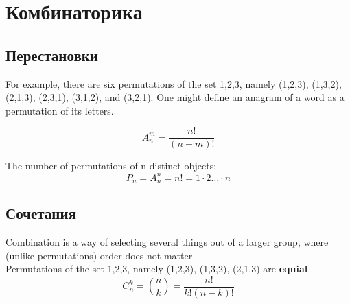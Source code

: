 \section{Комбинаторика}

\subsection{Перестановки}

For example, there are six permutations of the set {1,2,3}, namely (1,2,3), (1,3,2), (2,1,3), (2,3,1), (3,1,2), and (3,2,1). One might define an anagram of a word as a permutation of its letters. 

$$
A_n^m=\frac{n!}{(n-m)!} 
$$

The number of permutations of n distinct objects: \\

$$
P_n=A_n^n=n!=1\cdot2  \dots \cdot n
$$

\subsection{Сочетания}

Combination is a way of selecting several things out of a larger group, where (unlike permutations) order does not matter \\
Permutations of the set {1,2,3}, namely (1,2,3), (1,3,2), (2,1,3) are {\bfseries equial} \\

$$
C_n^k = {n\choose k} = \frac{n!}{k!\left(n-k\right)!}
$$
